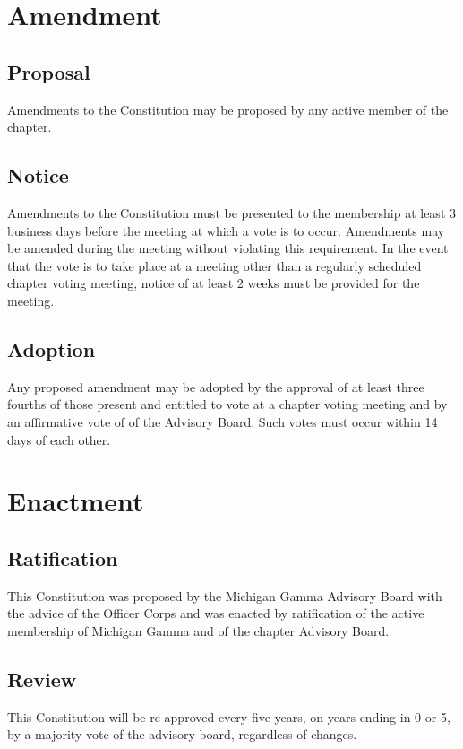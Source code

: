 \chapter{Amendment}
\section{Proposal}
Amendments to the Constitution may be proposed by any active member of the chapter.

\section{Notice}
Amendments to the Constitution must be presented to the membership at least 3 business days before the meeting at which a vote is to occur.
Amendments may be amended during the meeting without violating this requirement.
In the event that the vote is to take place at a meeting other than a regularly scheduled chapter voting meeting, notice of at least 2 weeks must be provided for the meeting.

\section{Adoption}
Any proposed amendment may be adopted by the approval of at least three fourths of those present and entitled to vote at a chapter voting meeting and by an affirmative vote of  of the Advisory Board.
Such votes must occur within 14 days of each other.

\chapter{Enactment}
\section{Ratification}
This Constitution was proposed by the Michigan Gamma Advisory Board with the advice of the Officer Corps and was enacted \dateapproved by ratification of the active membership of Michigan Gamma and of the chapter Advisory Board.
\section{Review}
This Constitution will be re-approved every five years, on years ending in 0 or 5, by a majority vote of the advisory board, regardless of changes.